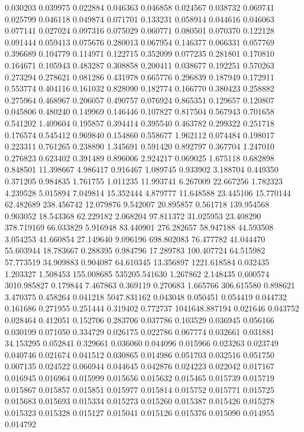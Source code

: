 0.030203
0.039975
0.022884
0.046363
0.046858
0.024567
0.038732
0.069741
0.025799
0.046118
0.049874
0.071701
0.133231
0.058914
0.044616
0.046063
0.077141
0.027024
0.097316
0.075029
0.060771
0.080501
0.070370
0.122128
0.091444
0.059413
0.075676
0.280013
0.067954
0.146377
0.066331
0.057769
0.396689
0.104779
0.114971
0.122715
0.352099
0.077235
0.281801
0.170810
0.164671
0.105943
0.483287
0.308858
0.200411
0.038677
0.192251
0.570263
0.273294
0.278621
0.081286
0.431978
0.665776
0.296839
0.187949
0.172911
0.553774
0.404116
0.161032
0.828090
0.182774
0.166770
0.380423
0.258882
0.275964
0.468967
0.206057
0.490757
0.076924
0.865351
0.129657
0.120807
0.045806
0.480240
0.149969
0.146446
0.107827
0.817504
0.567943
0.701658
0.541202
1.409604
0.195857
0.394414
0.395540
0.463782
0.299322
0.251718
0.176574
0.545412
0.969840
0.154860
0.558677
1.962112
0.074484
0.198017
0.223311
0.761265
0.238890
1.345691
0.591420
0.892797
0.367704
1.247010
0.276823
0.623402
0.391489
0.896006
2.924217
0.069025
1.675118
0.682898
0.848501
11.398667
4.986417
0.916467
1.089745
0.933902
3.188704
0.449350
0.371205
0.984835
1.761755
1.011235
11.993741
6.267009
22.667256
1.782323
4.239528
5.015894
7.049814
15.352444
4.879777
11.648588
23.445106
15.770144
62.482689
238.456742
12.079876
9.542007
20.895857
0.561718
139.954568
0.903052
18.543368
62.229182
2.068204
97.811372
31.025953
23.408290
378.719169
66.033829
5.916948
83.440901
276.282657
58.947188
44.593508
3.054253
41.660854
27.149640
9.096196
698.802083
76.477782
41.044470
55.603944
18.783667
0.288395
0.984796
17.289783
100.407724
64.515982
57.773519
34.909883
0.904087
64.610345
13.356897
1221.618584
0.032435
1.203327
1.508453
155.008685
535205.541630
1.267862
2.148435
0.600574
3010.985827
0.179844
7.467863
0.369119
0.270683
1.665766
306.615580
0.898621
3.470375
0.458264
0.041218
5047.831162
0.043048
0.050451
0.054419
0.044732
0.161686
0.271955
0.251444
0.319402
0.772737
1041648.887194
0.021646
0.043752
0.028464
0.412051
0.152706
0.283706
0.037786
0.103529
0.036945
0.056166
0.030199
0.071050
0.334729
0.026175
0.022786
0.067774
0.032661
0.031881
34.153295
0.052841
0.329661
0.036060
0.044096
0.015966
0.023263
0.023749
0.040746
0.021674
0.041512
0.030865
0.014986
0.051703
0.032516
0.051750
0.007135
0.024522
0.066944
0.044645
0.042876
0.024223
0.022042
0.017167
0.016945
0.016964
0.015999
0.015656
0.015632
0.015465
0.015739
0.015719
0.015867
0.015857
0.015851
0.015977
0.015814
0.015752
0.015771
0.015725
0.015683
0.015693
0.015334
0.015273
0.015260
0.015387
0.015426
0.015278
0.015323
0.015328
0.015127
0.015041
0.015126
0.015376
0.015090
0.014955
0.014792
